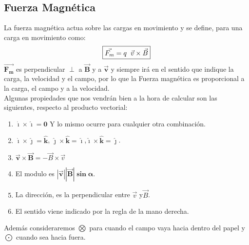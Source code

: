 \subsection{Fuerza Magnética}
\newline
\noindent La fuerza magnética actua sobre las cargas en movimiento y se define, para una carga en movimiento como:
\[
        \boxed{\vec{F_m} = q\hspace{2mm} \vec{v} \times \vec{B}}
\]
\noindent \(\bm{\vec{F_m}}\) es perpendicular \(\bm{\perp}\) a \(\bm{\vec{B}}\) y a \(\bm{\vec{v}}\) y siempre irá en el sentido que indique la carga, la velocidad y el campo, por lo que la Fuerza magnética es proporcional a la carga, el campo y a la velocidad.
\\
Algunas propiedades que nos vendrán bien a la hora de calcular son las siguientes, respecto al producto vectorial:
\begin{enumerate}
        \item \(\bm{\hat{\imath} \times \hat{\imath} = 0}\) Y lo mismo ocurre para cualquier otra combinación.
        \item \(\bm{\hat{\imath}\times \hat{\jmath} = \hat{k}}\), \(\bm{\hat{\jmath}\times\hat{k}=\hat{\imath}}\),\(\bm{\hat{\imath}\times\hat{k}=\hat{\jmath}}\).
        \item \(\bm{\vec{v} \times \vec{B}} = - \vec{B} \times \vec{v}\)
        \item El modulo es \(\bm{\left | \vec{v} \right |\left | \vec{B} \right |\sin{\alpha}}\).
        \item La dirección, es la perpendicular entre \(\vec{v}\) y\(\vec{B}\).
        \item El sentido viene indicado por la regla de la mano derecha.
\end{enumerate}
\noindent Además consideraremos \(\bm{\bigotimes}\) para cuando el campo vaya hacia dentro del papel y \(\bm{\bigodot}\) cuando sea hacia fuera.

